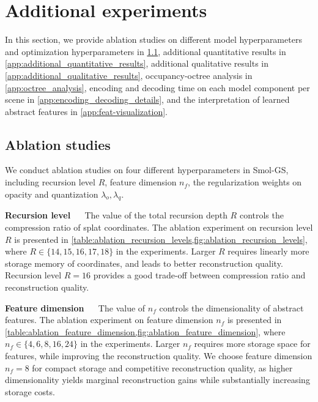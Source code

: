 \documentclass{article}
\newcommand{\ours}{Smol-GS\xspace}
\renewcommand{\paragraph}[1]{\noindent\textbf{#1}~~}
\begin{document}
\section{Additional experiments}
\label{app:experiments}
In this section, we provide ablation studies on different model hyperparameters and optimization hyperparameters in \cref{app:ablation_study}, additional quantitative results in \cref{app:additional_quantitative_results}, additional qualitative results in \cref{app:additional_qualitative_results}, occupancy-octree analysis in \cref{app:octree_analysis}, encoding and decoding time on each model component per scene in \cref{app:encoding_decoding_details}, and the interpretation of learned abstract features in \cref{app:feat-visualization}.

\subsection{Ablation studies}
\label{app:ablation_study}
We conduct ablation studies on four different hyperparameters in \ours, including recursion level $R$, feature dimension $n_f$, the regularization weights on opacity and quantization $\lambda_o, \lambda_q$. 

\paragraph{Recursion level } 
The value of the total recursion depth $R$ controls the compression ratio of splat coordinates. The ablation experiment on recursion level $R$ is presented in \cref{table:ablation_recursion_levels,fig:ablation_recursion_levels}, where $R \in \{14, 15, 16, 17, 18\}$ in the experiments. Larger $R$ requires linearly more storage memory of coordinates, and leads to better reconstruction quality. Recursion level $R=16$ provides a good trade-off between compression ratio and reconstruction quality. 
%







\paragraph{Feature dimension } 
The value of $n_f$ controls the dimensionality of abstract features.  The ablation experiment on feature dimension $n_f$ is presented in \cref{table:ablation_feature_dimension,fig:ablation_feature_dimension}, where $n_f \in \{ 4, 6, 8, 16, 24\}$ in the experiments. Larger $n_f$ requires more storage space for features, while improving the reconstruction quality. We choose feature dimension $n_f=8$ for compact storage and competitive reconstruction quality, as higher dimensionality yields marginal reconstruction gains while substantially increasing storage costs.
\end{document}
